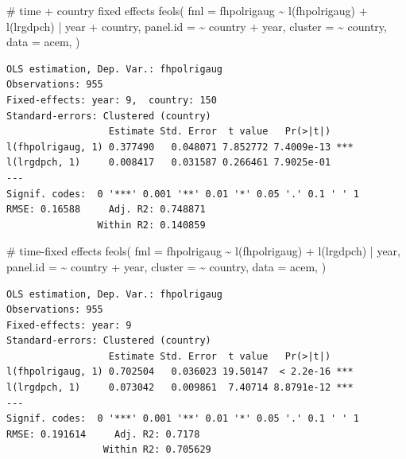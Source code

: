 \documentclass[
  a4paper,
  DIV=11,
  oneside]{scrreprt}
\newenvironment{Shaded}{\begin{snugshade}}{\end{snugshade}}
\newcommand{\AttributeTok}[1]{\textcolor[rgb]{0.40,0.45,0.13}{#1}}
\newcommand{\CommentTok}[1]{\textcolor[rgb]{0.37,0.37,0.37}{#1}}
\newcommand{\FunctionTok}[1]{\textcolor[rgb]{0.28,0.35,0.67}{#1}}
\newcommand{\NormalTok}[1]{\textcolor[rgb]{0.00,0.23,0.31}{#1}}
\newcommand{\SpecialCharTok}[1]{\textcolor[rgb]{0.37,0.37,0.37}{#1}}
\begin{document}
\begin{Shaded}
\begin{Highlighting}[]
\CommentTok{\# time + country fixed effects}
\FunctionTok{feols}\NormalTok{(}
  \AttributeTok{fml =}\NormalTok{ fhpolrigaug }\SpecialCharTok{\textasciitilde{}} \FunctionTok{l}\NormalTok{(fhpolrigaug) }\SpecialCharTok{+} \FunctionTok{l}\NormalTok{(lrgdpch) }
  \SpecialCharTok{|}\NormalTok{ year }\SpecialCharTok{+}\NormalTok{ country,}
  \AttributeTok{panel.id =} \SpecialCharTok{\textasciitilde{}}\NormalTok{ country }\SpecialCharTok{+}\NormalTok{ year,}
  \AttributeTok{cluster =} \SpecialCharTok{\textasciitilde{}}\NormalTok{ country,}
  \AttributeTok{data =}\NormalTok{ acem, }
\NormalTok{)}
\end{Highlighting}
\end{Shaded}

\begin{verbatim}
OLS estimation, Dep. Var.: fhpolrigaug
Observations: 955
Fixed-effects: year: 9,  country: 150
Standard-errors: Clustered (country) 
                  Estimate Std. Error  t value   Pr(>|t|)    
l(fhpolrigaug, 1) 0.377490   0.048071 7.852772 7.4009e-13 ***
l(lrgdpch, 1)     0.008417   0.031587 0.266461 7.9025e-01    
---
Signif. codes:  0 '***' 0.001 '**' 0.01 '*' 0.05 '.' 0.1 ' ' 1
RMSE: 0.16588     Adj. R2: 0.748871
                Within R2: 0.140859
\end{verbatim}

\begin{Shaded}
\begin{Highlighting}[]
\CommentTok{\# time{-}fixed effects}
\FunctionTok{feols}\NormalTok{(}
  \AttributeTok{fml =}\NormalTok{ fhpolrigaug }\SpecialCharTok{\textasciitilde{}} \FunctionTok{l}\NormalTok{(fhpolrigaug) }\SpecialCharTok{+} \FunctionTok{l}\NormalTok{(lrgdpch) }
  \SpecialCharTok{|}\NormalTok{ year,}
  \AttributeTok{panel.id =} \SpecialCharTok{\textasciitilde{}}\NormalTok{ country }\SpecialCharTok{+}\NormalTok{ year,}
  \AttributeTok{cluster =} \SpecialCharTok{\textasciitilde{}}\NormalTok{ country,}
  \AttributeTok{data =}\NormalTok{ acem, }
\NormalTok{)}
\end{Highlighting}
\end{Shaded}

\begin{verbatim}
OLS estimation, Dep. Var.: fhpolrigaug
Observations: 955
Fixed-effects: year: 9
Standard-errors: Clustered (country) 
                  Estimate Std. Error  t value   Pr(>|t|)    
l(fhpolrigaug, 1) 0.702504   0.036023 19.50147  < 2.2e-16 ***
l(lrgdpch, 1)     0.073042   0.009861  7.40714 8.8791e-12 ***
---
Signif. codes:  0 '***' 0.001 '**' 0.01 '*' 0.05 '.' 0.1 ' ' 1
RMSE: 0.191614     Adj. R2: 0.7178  
                 Within R2: 0.705629
\end{verbatim}
\end{document}
